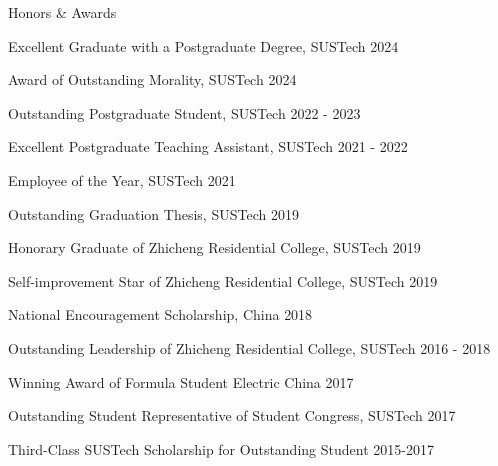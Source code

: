 \documentclass{resume} %
\begin{document}
\begin{rSection}{Honors \& Awards}
     \vspace{-8pt}
      \item {Excellent Graduate with a Postgraduate Degree, SUSTech}   \hfill {2024}  
     \vspace{-5pt}
     \item {Award of Outstanding Morality, SUSTech}   \hfill {2024}  
     \vspace{-5pt}
    \item {Outstanding Postgraduate Student, SUSTech}   \hfill {2022 - 2023}  
     \vspace{-5pt}
    \item {Excellent Postgraduate Teaching Assistant, SUSTech}   \hfill {2021 - 2022}  
     \vspace{-5pt}
    \item {Employee of the Year, SUSTech}   \hfill {2021}  
     \vspace{-5pt}
    \item {Outstanding Graduation Thesis, SUSTech}        \hfill {2019}
     \vspace{-5pt}
    \item {Honorary Graduate of Zhicheng Residential College, SUSTech}   \hfill {2019}
     \vspace{-5pt}
    \item {Self-improvement Star of Zhicheng Residential College, SUSTech}   \hfill {2019}
     \vspace{-5pt}
    \item {National Encouragement Scholarship, China}        \hfill {2018}
     \vspace{-5pt}
    \item {Outstanding Leadership of Zhicheng Residential College, SUSTech} \hfill {2016 - 2018}
    \vspace{-5pt}  
     \item {Winning Award of Formula Student Electric China} \hfill {2017}
    \vspace{-5pt}
   \item {Outstanding Student Representative of Student Congress, SUSTech} \hfill {2017}
   \vspace{-5pt}
   \item {Third-Class SUSTech Scholarship for Outstanding Student}         \hfill {2015-2017}
   \vspace{-5pt}    
    \end{rSection}
\end{document}
